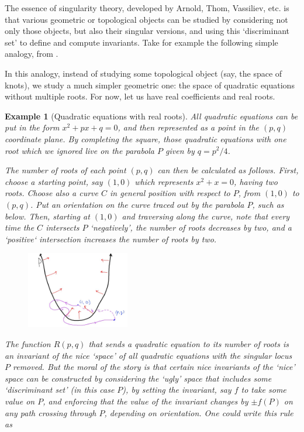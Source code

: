\documentclass[12pt]{report}
\theoremstyle{regular}
\newtheorem{example}{Example}
\begin{document}
        The essence of singularity theory, developed by Arnold, Thom, Vassiliev, etc. is that various geometric or topological objects can be studied by considering not only those objects, but also their singular versions, and using this `discriminant set' to define and compute invariants. Take for example the following simple analogy, from \cite{knots-links-and-their-invariants}.

        In this analogy, instead of studying some topological object (say, the space of knots), we study a much simpler geometric one: the space of quadratic equations without multiple roots. For now, let us have real coefficients and real roots.

        \begin{example}[Quadratic equations with real roots]
                All quadratic equations can be put in the form \(x^{2} + px + q = 0\), and then represented as a point in the \((p, q)\) coordinate plane. By completing the square, those quadratic equations with one root which we ignored live on the parabola \(P\) given by \(q = p^{2}/4\).

                The number of roots of each point \((p, q)\) can then be calculated as follows. First, choose a starting point, say \((1, 0)\) which represents \(x^{2} + x = 0\), having two roots. Choose also a curve \(C\) in general position with respect to \(P\), from \((1, 0)\) to \((p, q)\). Put an orientation on the curve traced out by the parabola \(P\), such as below. Then, starting at \((1, 0)\) and traversing along the curve, note that every time the \(C\) intersects \(P\) `negatively', the number of roots decreases by two, and a `positive` intersection increases the number of roots by two.

                \begin{figure}[H]
                        \centering
                        \includegraphics[width=0.4\textwidth]{graphics/parabola_example.jpg}
                \end{figure}

                The function \(R(p, q)\) that sends a quadratic equation to its number of roots is an invariant of the nice `space' of all quadratic equations with the singular locus \(P\) removed. But the moral of the story is that certain nice invariants of the `nice' space can be constructed by considering the `ugly' space that includes some `discriminant set' (in this case \(P\)), by setting the invariant, say \(f\) to take some value on \(P\), and enforcing that the value of the invariant changes by \(\pm f(P)\) on any path crossing through \(P\), depending on orientation. One could write this rule as


\end{example}
\end{document}
